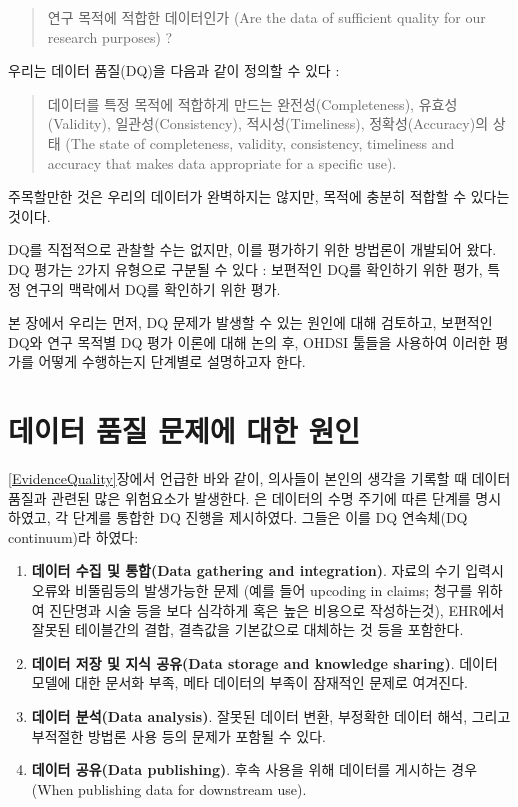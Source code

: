 \documentclass[10.5pt]{book}
\providecommand{\tightlist}{%
  \setlength{\itemsep}{0pt}\setlength{\parskip}{0pt}}
\theoremstyle{definition}
\theoremstyle{definition}
\theoremstyle{definition}
\theoremstyle{remark}
\begin{document}
\begin{quote}
연구 목적에 적합한 데이터인가 (Are the data of sufficient quality for
our research purposes) ?
\end{quote}

우리는 데이터 품질(DQ)을 다음과 같이 정의할 수 있다
\citep{roebuck_2012}: 

\begin{quote}
데이터를 특정 목적에 적합하게 만드는 완전성(Completeness),
유효성(Validity), 일관성(Consistency), 적시성(Timeliness),
정확성(Accuracy)의 상태 (The state of completeness, validity,
consistency, timeliness and accuracy that makes data appropriate for a
specific use).
\end{quote}

주목할만한 것은 우리의 데이터가 완벽하지는 않지만, 목적에 충분히 적합할
수 있다는 것이다.

DQ를 직접적으로 관찰할 수는 없지만, 이를 평가하기 위한 방법론이 개발되어
왔다. DQ 평가는 2가지 유형으로 구분될 수 있다 \citep{weiskopf_2013}:
보편적인 DQ를 확인하기 위한 평가, 특정 연구의 맥락에서 DQ를 확인하기
위한 평가.

본 장에서 우리는 먼저, DQ 문제가 발생할 수 있는 원인에 대해 검토하고,
보편적인 DQ와 연구 목적별 DQ 평가 이론에 대해 논의 후, OHDSI 툴들을
사용하여 이러한 평가를 어떻게 수행하는지 단계별로 설명하고자 한다.

\section{데이터 품질 문제에 대한 원인}\label{----}

\ref{EvidenceQuality}장에서 언급한 바와 같이, 의사들이 본인의 생각을
기록할 때 데이터 품질과 관련된 많은 위험요소가 발생한다.
\citet{dasu_2003} 은 데이터의 수명 주기에 따른 단계를 명시하였고, 각
단계를 통합한 DQ 진행을 제시하였다. 그들은 이를 DQ 연속체(DQ
continuum)라 하였다:

\begin{enumerate}
\def\labelenumi{\arabic{enumi}.}
\tightlist
\item
  \textbf{데이터 수집 및 통합(Data gathering and integration)}. 자료의
  수기 입력시 오류와 비뚤림등의 발생가능한 문제 (예를 들어 upcoding in
  claims; 청구를 위하여 진단명과 시술 등을 보다 심각하게 혹은 높은
  비용으로 작성하는것), EHR에서 잘못된 테이블간의 결합, 결측값을
  기본값으로 대체하는 것 등을 포함한다.
\item
  \textbf{데이터 저장 및 지식 공유(Data storage and knowledge sharing)}.
  데이터 모델에 대한 문서화 부족, 메타 데이터의 부족이 잠재적인 문제로
  여겨진다.
\item
  \textbf{데이터 분석(Data analysis)}. 잘못된 데이터 변환, 부정확한
  데이터 해석, 그리고 부적절한 방법론 사용 등의 문제가 포함될 수 있다.
\item
  \textbf{데이터 공유(Data publishing)}. 후속 사용을 위해 데이터를
  게시하는 경우 (When publishing data for downstream use).
\end{enumerate}
\end{document}
